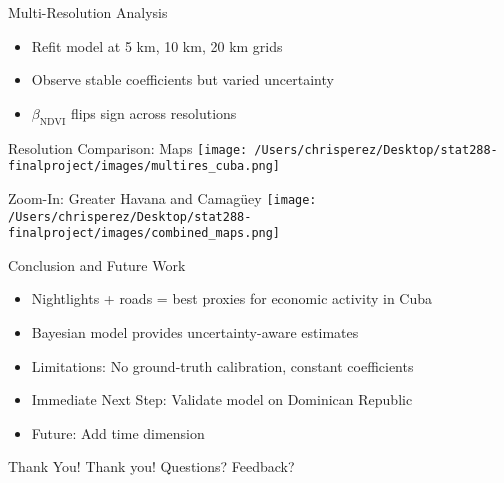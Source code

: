 \documentclass{beamer}
\begin{document}
\begin{frame}{Multi-Resolution Analysis}
\begin{itemize}
  \item Refit model at 5 km, 10 km, 20 km grids
  \item Observe stable coefficients but varied uncertainty
  \item $\beta_{\text{NDVI}}$ flips sign across resolutions
\end{itemize}
\end{frame}

\begin{frame}{Resolution Comparison: Maps}
\texttt{[image: /Users/chrisperez/Desktop/stat288-finalproject/images/multires\_cuba.png]}
\end{frame}

\begin{frame}{Zoom-In: Greater Havana and Camagüey}
\texttt{[image: /Users/chrisperez/Desktop/stat288-finalproject/images/combined\_maps.png]}
\end{frame}


\begin{frame}{Conclusion and Future Work}
\begin{itemize}
  \item Nightlights + roads = best proxies for economic activity in Cuba
  \item Bayesian model provides uncertainty-aware estimates
  \item Limitations: No ground-truth calibration, constant coefficients
  \item Immediate Next Step: Validate model on Dominican Republic
  \item Future: Add time dimension
\end{itemize}
\end{frame}

\begin{frame}{Thank You!}
  \centering
  \Large
  Thank you! 
  Questions? Feedback?
\end{frame}
\end{document}
